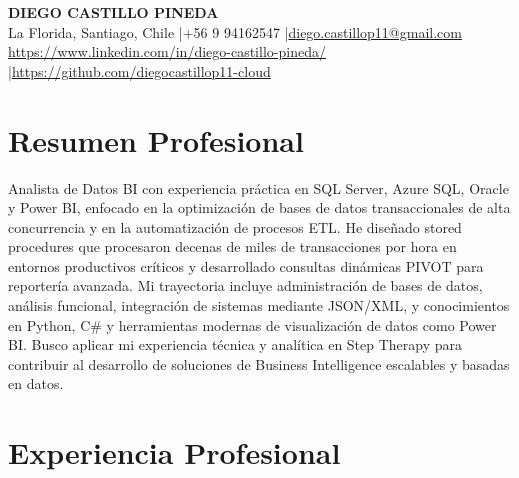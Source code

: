 \documentclass[11pt,letterpaper]{article}
\begin{document}
\begin{center}
{\fontsize{16}{19}\selectfont\textbf{\MakeUppercase{Diego Castillo Pineda}}}\\[4pt]
{\small La Florida, Santiago, Chile \quad|\quad +56 9 94162547 \quad|\quad \href{mailto:diego.castillop11@gmail.com}{diego.castillop11@gmail.com}\\
\href{https://https://www.linkedin.com/in/diego-castillo-pineda/}{https://www.linkedin.com/in/diego-castillo-pineda/} \quad|\quad \href{https://https://github.com/diegocastillop11-cloud}{https://github.com/diegocastillop11-cloud}}
\end{center}

\section{Resumen Profesional}
Analista de Datos BI con experiencia práctica en SQL Server, Azure SQL, Oracle y Power BI, enfocado en la optimización de bases de datos transaccionales de alta concurrencia y en la automatización de procesos ETL. He diseñado stored procedures que procesaron decenas de miles de transacciones por hora en entornos productivos críticos y desarrollado consultas dinámicas PIVOT para reportería avanzada. Mi trayectoria incluye administración de bases de datos, análisis funcional, integración de sistemas mediante JSON/XML, y conocimientos en Python, C\# y herramientas modernas de visualización de datos como Power BI. Busco aplicar mi experiencia técnica y analítica en Step Therapy para contribuir al desarrollo de soluciones de Business Intelligence escalables y basadas en datos.

\section{Experiencia Profesional}
\end{document}
